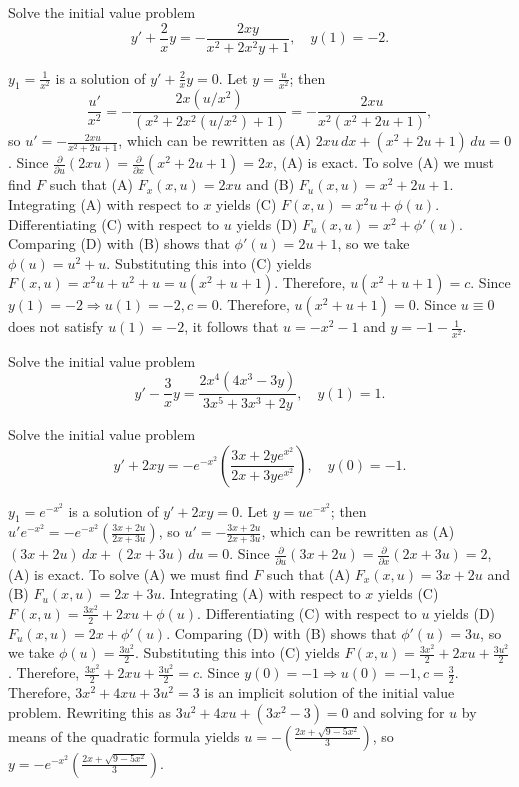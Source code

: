 \documentclass{ximera}
\begin{document}
\begin{problem}\label{exer:2.5.38}
Solve the initial value problem
$$
y'+\frac{2}{x}y=-\frac{2xy}{x^2+2x^2y+1},\quad y(1)=-2.
$$



\begin{solution}
    $y_1=\frac{1}{ x^2}$ is a solution of $y'+\frac{2}{ x}y=0$.
Let $y=\frac{u}{ x^2}$; then
$$
\frac{u'}{ x^2}=-\frac{2x(u/x^2)}{
\left(x^2+2x^2(u/x^2)+1\right)}=
-\frac{2xu}{ x^2(x^2+2u+1)},
$$
so  $u'=-\frac{2xu}{ x^2+2u+1}$, which can be rewritten as (A)
$2xu\,dx+(x^2+2u+1)\,du=0$. Since $\frac{\partial }{\partial
u}(2xu)=\frac{\partial }{\partial x}(x^2+2u+1)=2x$, (A)
is exact. To solve (A)
we must find $F$ such that
(A) $F_x(x,u)=2xu$ and
(B) $F_u(x,u)=x^2+2u+1$.
Integrating (A) with respect to $x$ yields
(C) $F(x,u)=x^2u+\phi(u)$.
Differentiating (C) with respect to $u$  yields
(D) $F_u(x,u)=x^2+\phi'(u)$.
Comparing (D) with (B)  shows that
$\phi'(u)=2u+1$, so we take
$\phi(u)=u^2+u$.
Substituting this into (C) yields
$F(x,u)=x^2u+u^2+u=u(x^2+u+1)$.
Therefore, $u(x^2+u+1)=c$.
Since $y(1)=-2\Rightarrow u(1)=-2,
c=0$. Therefore,  $u(x^2+u+1)=0$. Since $u\equiv0$ does not satisfy
$u(1)=-2$, it follows that $u=-x^2-1$ and $y=-1-\frac{1}{ x^2}$.
\end{solution}
\end{problem}

\begin{problem}\label{exer:2.5.39}
Solve the initial value problem
$$
y'-\frac{3}{x}y=\frac{2x^4(4x^3-3y)}{3x^5+3x^3+2y},\quad y(1)=1.
$$
\end{problem}

\begin{problem}\label{exer:2.5.40}
Solve the initial value problem
$$
y'+2xy=-e^{-x^2}\left(\frac{3x+2ye^{x^2}}{2x+3ye^{x^2}}\right),\quad
y(0)=-1.
$$



\begin{solution}
    $y_1=e^{-x^2}$ is a solution of $y'+2xy=0$.
Let $y=ue^{-x^2}$; then
$u'e^{-x^2}=-e^{-x^2}\left(\frac{3x+2u}{ 2x+3u}\right)$,
so  $u'=-\frac{3x+2u}{2x+3u}$, which can be rewritten as (A)
$(3x+2u)\,dx+(2x+3u)\,du=0$. Since $\frac{\partial
}{\partial
u}(3x+2u)=\frac{\partial }{\partial x}(2x+3u)=2$, (A)
is exact. To solve (A)
we must find $F$ such that
(A) $F_x(x,u)=3x+2u$ and
(B) $F_u(x,u)=2x+3u$.
Integrating (A) with respect to $x$ yields
(C) $F(x,u)=\frac{3x^2}{2}+2xu+\phi(u)$.
Differentiating (C) with respect to $u$  yields
(D) $F_u(x,u)=2x+\phi'(u)$.
Comparing (D) with (B)  shows that
$\phi'(u)=3u$, so we take
$\phi(u)=\frac{3u^2}{2}$.
Substituting this into (C) yields
$F(x,u)=\frac{3x^2}{2}+2xu+\frac{3u^2}{2}$.
Therefore, $\frac{3x^2}{2}+2xu+\frac{3u^2}{2}=c$.
Since $y(0)=-1\Rightarrow u(0)=-1,
c=\frac{3}{2}$. Therefore,  $3x^2+4xu+3u^2=3$
is an implicit solution of the initial value problem.
Rewriting this as $3u^2+4xu+(3x^2-3)=0$ and
 solving  for $u$ by means of the quadratic formula
yields $u=-\left(\frac{2x+\sqrt{9-5x^2}}{3}\right)$, so
 $y=-e^{-x^2}\left(\frac{2x+\sqrt{9-5x^2}}{3}\right)$.
\end{solution}
\end{problem}
\end{document}
